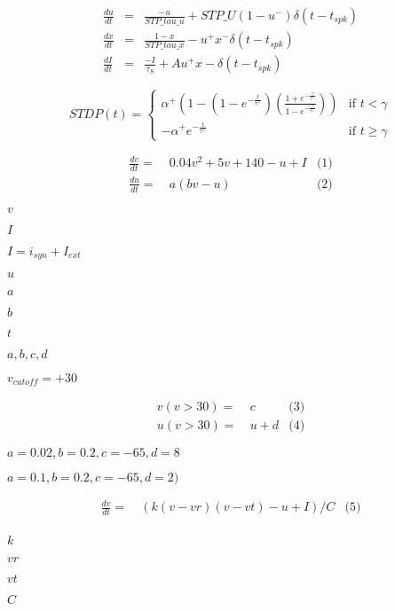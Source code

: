 \documentclass{article}
\begin{document}
\begin{eqnarray} \frac{du}{dt} & = & \frac{-u}{STP\_tau\_u} + STP\_U (1-u^-) \delta(t-t_{spk}) \\ \frac{dx}{dt} & = & \frac{1-x}{STP\_tau\_x} - u^+ x^- \delta(t-t_{spk}) \\ \frac{dI}{dt} & = & \frac{-I}{\tau_S} + A u^+ x- \delta(t-t_{spk}) \end{eqnarray}
\pagebreak

\[ STDP(t) = \begin{cases} \alpha^+(1-(1-e^{-\frac{t}{\tau^+}})(\frac{1+e^{-\frac{\gamma}{\tau^+}}}{1-e^{-\frac{\gamma}{\tau^+}}})) & \text{if } t < \gamma \\ -\alpha^+ e^{-\frac{t}{\tau^+}} & \text{if } t \geq \gamma \end{cases} \]
\pagebreak

\begin{align*} \frac{dv}{dt} = & ~ 0.04v^2 + 5v + 140 - u + I & \text{(1)}\\ \frac{du}{dt} = & ~ a (bv - u) & \text{(2)} \end{align*}
\pagebreak

$v$
\pagebreak

$I$
\pagebreak

$I = i_{syn} + I_{ext}$
\pagebreak

$u$
\pagebreak

$a$
\pagebreak

$b$
\pagebreak

$t$
\pagebreak

$a, b, c, d$
\pagebreak

$v_{cutoff}=+30$
\pagebreak

\begin{align*} v(v>30) = & ~ c & \text{(3)}\\ u(v>30) = & ~ u + d & \text{(4)}\end{align*}
\pagebreak

$a=0.02, b=0.2, c=-65, d=8$
\pagebreak

$a=0.1, b=0.2, c=-65, d=2)$
\pagebreak

\begin{align*} \frac{dv}{dt} = & ~ (k (v - vr) (v - vt) - u + I) / C & \text{(5)}\\ \end{align*}
\pagebreak

$k$
\pagebreak

$vr$
\pagebreak

$vt$
\pagebreak

$C$
\pagebreak
\end{document}
